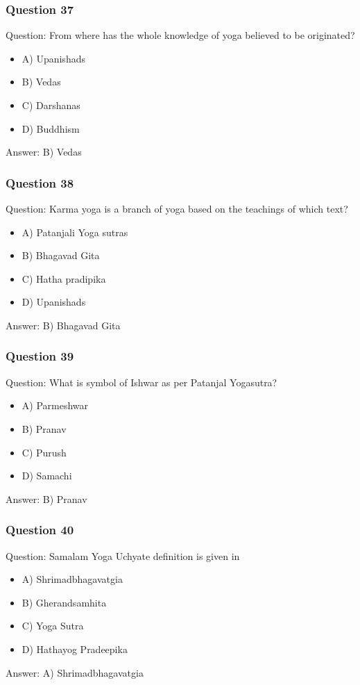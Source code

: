 \begin{frame}[fragile]\frametitle{Question 37}
Question: From where has the whole knowledge of yoga believed to be originated?
\begin{itemize}
\item A) Upanishads
\item B) Vedas
\item C) Darshanas
\item D) Buddhism
\end{itemize}
Answer: B) Vedas
\end{frame}

\begin{frame}[fragile]\frametitle{Question 38}
Question: Karma yoga is a branch of yoga based on the teachings of which text?
\begin{itemize}
\item A) Patanjali Yoga sutras
\item B) Bhagavad Gita
\item C) Hatha pradipika
\item D) Upanishads
\end{itemize}
Answer: B) Bhagavad Gita
\end{frame}

\begin{frame}[fragile]\frametitle{Question 39}
Question: What is symbol of Ishwar as per Patanjal Yogasutra?
\begin{itemize}
\item A) Parmeshwar
\item B) Pranav
\item C) Purush
\item D) Samachi
\end{itemize}
Answer: B) Pranav
\end{frame}

\begin{frame}[fragile]\frametitle{Question 40}
Question: Samalam Yoga Uchyate definition is given in
\begin{itemize}
\item A) Shrimadbhagavatgia
\item B) Gherandsamhita
\item C) Yoga Sutra
\item D) Hathayog Pradeepika
\end{itemize}
Answer: A) Shrimadbhagavatgia
\end{frame}

